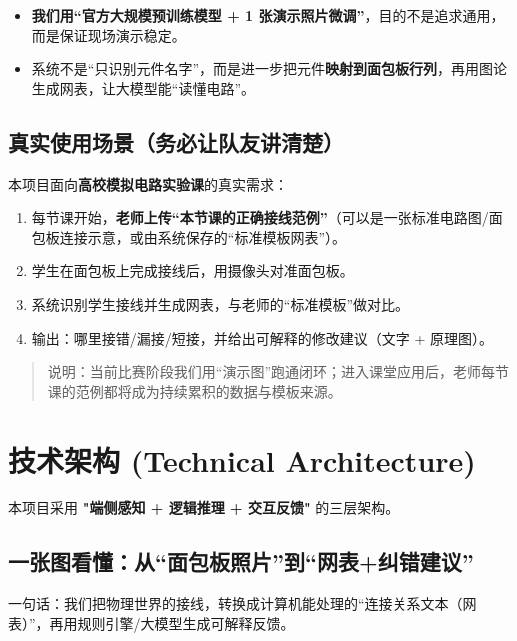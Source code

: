 \documentclass[a4paper,AutoFakeBold,oneside,12pt]{book}
\begin{document}
\begin{tcolorbox}[colback=BoxBg,colframe=IntelBlue,title=给队友的“记忆钩子”]
\begin{itemize}
    \item \textbf{我们用“官方大规模预训练模型 + 1 张演示照片微调”}，目的不是追求通用，而是保证现场演示稳定。
    \item 系统不是“只识别元件名字”，而是进一步把元件\textbf{映射到面包板行列}，再用图论生成网表，让大模型能“读懂电路”。
\end{itemize}
\end{tcolorbox}

\section{真实使用场景（务必让队友讲清楚）}
本项目面向\textbf{高校模拟电路实验课}的真实需求：

\begin{enumerate}
    \item 每节课开始，\textbf{老师上传“本节课的正确接线范例”}（可以是一张标准电路图/面包板连接示意，或由系统保存的“标准模板网表”）。
    \item 学生在面包板上完成接线后，用摄像头对准面包板。
    \item 系统识别学生接线并生成网表，与老师的“标准模板”做对比。
    \item 输出：哪里接错/漏接/短接，并给出可解释的修改建议（文字 + 原理图）。
\end{enumerate}

\begin{quote}
说明：当前比赛阶段我们用“演示图”跑通闭环；进入课堂应用后，老师每节课的范例都将成为持续累积的数据与模板来源。
\end{quote}

\chapter{技术架构 (Technical Architecture)}

本项目采用 \textbf{"端侧感知 + 逻辑推理 + 交互反馈"} 的三层架构。

\section{一张图看懂：从“面包板照片”到“网表+纠错建议”}

一句话：我们把物理世界的接线，转换成计算机能处理的“连接关系文本（网表）”，再用规则引擎/大模型生成可解释反馈。
\end{document}
